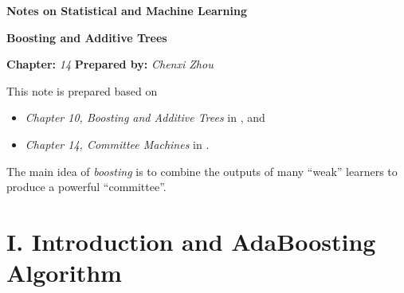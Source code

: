 \documentclass[12pt]{article}
\newcommand{\titlebox}[4]{
\begin{tcolorbox}[colback = blue!5!white!95, colframe = blue!70!black
]
  \noindent \textbf{ #1 } \hfill \textit{#2} 
  \begin{center}
  	 \LARGE{\textbf{#3}}
  \end{center}
\textbf{Chapter:} \textit{#4} \hfill \textbf{Prepared by:} \textit{Chenxi Zhou}
\end{tcolorbox}
}
\begin{document}
\titlebox{Notes on Statistical and Machine Learning}{}{Boosting and Additive Trees}{14}
\thispagestyle{plain}

\vspace{10pt}

This note is prepared based on 
\begin{itemize}
	\item \textit{Chapter 10, Boosting and Additive Trees} in \textcite{Friedman2001-np}, and 
	\item \textit{Chapter 14, Committee Machines} in \textcite{Izenman2009-jk}. 
\end{itemize}
The main idea of \textit{boosting} is to combine the outputs of many ``weak'' learners to produce a powerful ``committee''. 


\section*{I. Introduction and AdaBoosting Algorithm}
\end{document}
